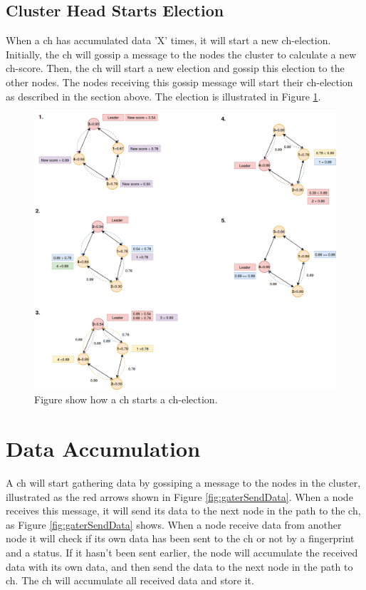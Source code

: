 \documentclass[USenglish]{uit-thesis}
\begin{document}
\newpage 

\subsection{Cluster Head Starts Election}
When a \gls{ch} has accumulated data 'X' times, it will start a new \gls{ch}-election. Initially, the \gls{ch} will gossip a message to the nodes the cluster to calculate a new \gls{ch}-score. Then, the \gls{ch} will start a new election and gossip this election to the other nodes. The nodes receiving this gossip message will start their \gls{ch}-election as described in the section above. The election is illustrated in Figure \ref{fig:chWantsLeaderElection}.

\begin{figure}
\centering
\includegraphics[width=\textwidth]{LeaderNewLeaderElection2.png}
\caption{Figure show how a \gls{ch} starts a \gls{ch}-election.}
\label{fig:chWantsLeaderElection}
\end{figure}


\newpage

\section{Data Accumulation}
A \gls{ch} will start gathering data by gossiping a message to the nodes in the cluster, illustrated as the red arrows shown in Figure \ref{fig:gaterSendData}. When a node receives this message, it will send its data to the next node in the path to the \gls{ch}, as Figure \ref{fig:gaterSendData} shows. When a node receive data from another node it will check if its own data has been sent to the \gls{ch} or not by a fingerprint and a status. If it hasn't been sent earlier, the node will accumulate the received data with its own data, and then send the data to the next node in the path to \gls{ch}. The \gls{ch} will accumulate all received data and store it.
\end{document}
